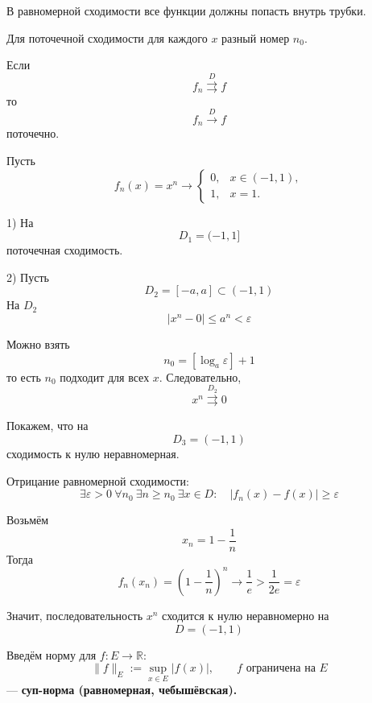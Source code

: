\documentclass[12pt,a4paper]{article}
\begin{document}
\begin{example}

    В равномерной сходимости все функции должны попасть внутрь трубки.

    Для поточечной сходимости для каждого $x$ разный номер $n_0$.

\end{example}

\begin{note}

    Если
    \[
        f_n\overset{D}{\rightrightarrows}f
    \]
    то
    \[
        f_n\overset{D}{\longrightarrow}f
    \]
    поточечно.

\end{note}

\begin{example}

    Пусть
    \[
        f_n(x)=x^n
        \longrightarrow
        \begin{cases}
            0, & x\in(-1,1),\\
            1, & x=1.
        \end{cases}
    \]

    1) На
    \[
        D_1=(-1,1]
    \]
    поточечная сходимость.

    2) Пусть
    \[
        D_2=[-a,a]\subset(-1,1)
    \]
    На $D_2$
    \[
        |x^n-0|\leq a^n<\varepsilon
    \]

    Можно взять
    \[
        n_0=\left[\log_a\varepsilon\right]+1
    \]
    то есть $n_0$ подходит для всех $x$. Следовательно,
    \[
        x^n\overset{D_2}{\rightrightarrows}0
    \]

    Покажем, что на
    \[
        D_3=(-1,1)
    \]
    сходимость к нулю неравномерная.

    Отрицание равномерной сходимости:
    \[
        \exists\varepsilon>0\ \forall n_0\
        \exists n\geq n_0\
        \exists x\in D:
        \quad
        |f_n(x)-f(x)|\geq\varepsilon
    \]

    Возьмём
    \[
        x_n=1-\frac1n
    \]
    Тогда
    \[
        f_n(x_n)=\left(1-\frac1n\right)^n
        \longrightarrow\frac1e>\frac{1}{2e}=\varepsilon
    \]

    Значит, последовательность $x^n$ сходится к нулю неравномерно на
    \[
        D=(-1,1)
    \]

\end{example}

Введём норму для $f\colon E\to\mathbb{R}$:
\[
    \|f\|_E:=\sup_{x\in E}|f(x)|,\qquad f\text{ ограничена на }E
\]
--- \textbf{суп-норма (равномерная, чебышёвская).}
\end{document}
